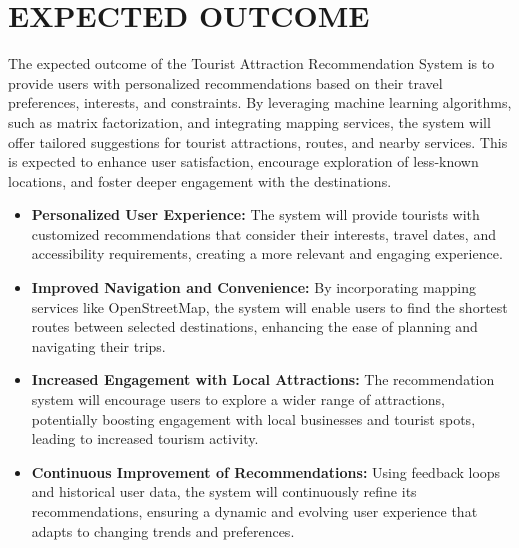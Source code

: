 \chapter{EXPECTED OUTCOME}
\noindent
The expected outcome of the Tourist Attraction Recommendation System is to provide users with personalized recommendations based on their travel preferences, interests, and constraints. By leveraging machine learning algorithms, such as matrix factorization, and integrating mapping services, the system will offer tailored suggestions for tourist attractions, routes, and nearby services. This is expected to enhance user satisfaction, encourage exploration of less-known locations, and foster deeper engagement with the destinations.

\begin{itemize}
    \item \textbf{Personalized User Experience:} The system will provide tourists with customized recommendations that consider their interests, travel dates, and accessibility requirements, creating a more relevant and engaging experience.
    \item \textbf{Improved Navigation and Convenience:} By incorporating mapping services like OpenStreetMap, the system will enable users to find the shortest routes between selected destinations, enhancing the ease of planning and navigating their trips.
    \item \textbf{Increased Engagement with Local Attractions:} The recommendation system will encourage users to explore a wider range of attractions, potentially boosting engagement with local businesses and tourist spots, leading to increased tourism activity.
    \item \textbf{Continuous Improvement of Recommendations:} Using feedback loops and historical user data, the system will continuously refine its recommendations, ensuring a dynamic and evolving user experience that adapts to changing trends and preferences.
\end{itemize}
